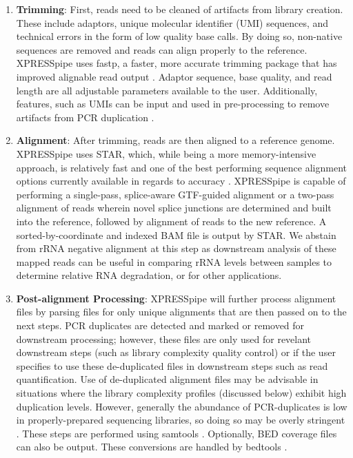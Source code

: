 \documentclass[11pt, a4paper, oneside]{article}
\begin{document}
\begin{enumerate}
  \item \textbf{Trimming}: First, reads need to be cleaned of artifacts from library creation. These include adaptors, unique molecular identifier (UMI) sequences, and technical errors in the form of low quality base calls. By doing so, non-native sequences are removed and reads can align properly to the reference. XPRESSpipe uses fastp, a faster, more accurate trimming package that has improved alignable read output \cite{fastp}. Adaptor sequence, base quality, and read length are all adjustable parameters available to the user. Additionally, features, such as UMIs can be input and used in pre-processing to remove artifacts from PCR duplication \cite{umi}.
  \item \textbf{Alignment}: After trimming, reads are then aligned to a reference genome. XPRESSpipe uses STAR, which, while being a more memory-intensive approach, is relatively fast and one of the best performing sequence alignment options currently available in regards to accuracy \cite{star, baruzzo_natmeth}. XPRESSpipe is capable of performing a single-pass, splice-aware GTF-guided alignment or a two-pass alignment of reads wherein novel splice junctions are determined and built into the reference, followed by alignment of reads to the new reference. A sorted-by-coordinate and indexed BAM file is output by STAR. We abstain from rRNA negative alignment at this step as downstream analysis of these mapped reads can be useful in comparing rRNA levels between samples to determine relative RNA degradation, or for other applications.
  \item \textbf{Post-alignment Processing}: XPRESSpipe will further process alignment files by parsing files for only unique alignments that are then passed on to the next steps. PCR duplicates are detected and marked or removed for downstream processing; however, these files are only used for revelant downstream steps (such as library complexity quality control) or if the user specifies to use these de-duplicated files in downstream steps such as read quantification. Use of de-duplicated alignment files may be advisable in situations where the library complexity profiles (discussed below) exhibit high duplication levels. However, generally the abundance of PCR-duplicates is low in properly-prepared sequencing libraries, so doing so may be overly stringent \cite{umi}. These steps are performed using samtools \cite{samtools}. Optionally, BED coverage files can also be output. These conversions are handled by bedtools \cite{bedtools}.

\end{enumerate}
\end{document}
